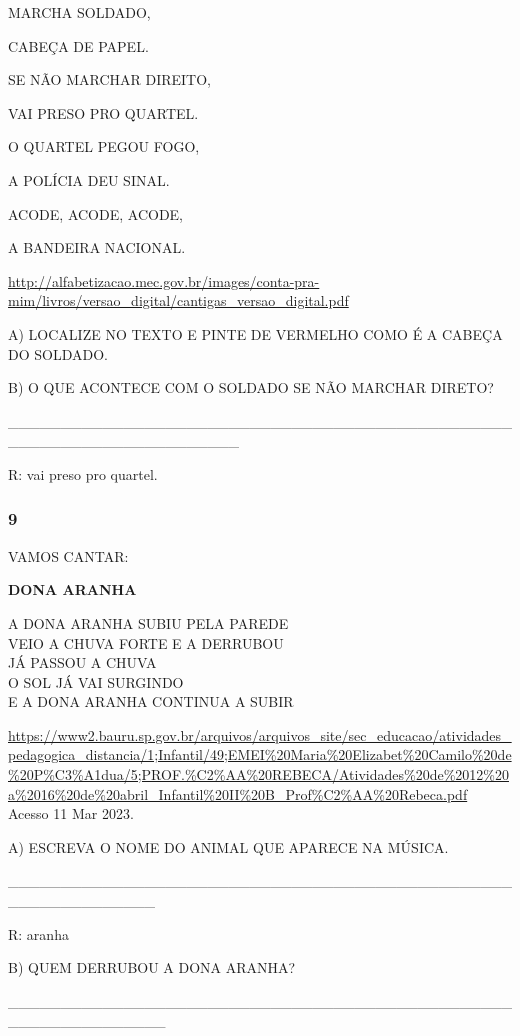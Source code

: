 MARCHA SOLDADO,

CABEÇA DE PAPEL.

SE NÃO MARCHAR DIREITO,

VAI PRESO PRO QUARTEL.

O QUARTEL PEGOU FOGO,

A POLÍCIA DEU SINAL.

ACODE, ACODE, ACODE,

A BANDEIRA NACIONAL.

\url{http://alfabetizacao.mec.gov.br/images/conta-pra-mim/livros/versao_digital/cantigas_versao_digital.pdf}

A) LOCALIZE NO TEXTO E PINTE DE VERMELHO COMO É A CABEÇA DO SOLDADO.

B) O QUE ACONTECE COM O SOLDADO SE NÃO MARCHAR DIRETO?

\_\_\_\_\_\_\_\_\_\_\_\_\_\_\_\_\_\_\_\_\_\_\_\_\_\_\_\_\_\_\_\_\_\_\_\_\_\_\_\_\_\_\_\_\_\_\_\_\_\_\_\_\_\_\_\_\_\_\_\_\_\_\_\_\_\_\_\_\_\_

R: vai preso pro quartel.

\subsubsection{9 }\label{section-37}

VAMOS CANTAR:

\textbf{DONA ARANHA}

A DONA ARANHA SUBIU PELA PAREDE\\
VEIO A CHUVA FORTE E A DERRUBOU\\
JÁ PASSOU A CHUVA\\
O SOL JÁ VAI SURGINDO\\
E A DONA ARANHA CONTINUA A SUBIR

\url{https://www2.bauru.sp.gov.br/arquivos/arquivos_site/sec_educacao/atividades_pedagogica_distancia/1;Infantil/49;EMEI\%20Maria\%20Elizabet\%20Camilo\%20de\%20P\%C3\%A1dua/5;PROF.\%C2\%AA\%20REBECA/Atividades\%20de\%2012\%20a\%2016\%20de\%20abril_Infantil\%20II\%20B_Prof\%C2\%AA\%20Rebeca.pdf}
Acesso 11 Mar 2023.

A) ESCREVA O NOME DO ANIMAL QUE APARECE NA MÚSICA.

\_\_\_\_\_\_\_\_\_\_\_\_\_\_\_\_\_\_\_\_\_\_\_\_\_\_\_\_\_\_\_\_\_\_\_\_\_\_\_\_\_\_\_\_\_\_\_\_\_\_\_\_\_\_\_\_\_\_\_\_\_\_

R: aranha

B) QUEM DERRUBOU A DONA ARANHA?

\_\_\_\_\_\_\_\_\_\_\_\_\_\_\_\_\_\_\_\_\_\_\_\_\_\_\_\_\_\_\_\_\_\_\_\_\_\_\_\_\_\_\_\_\_\_\_\_\_\_\_\_\_\_\_\_\_\_\_\_\_\_\_

